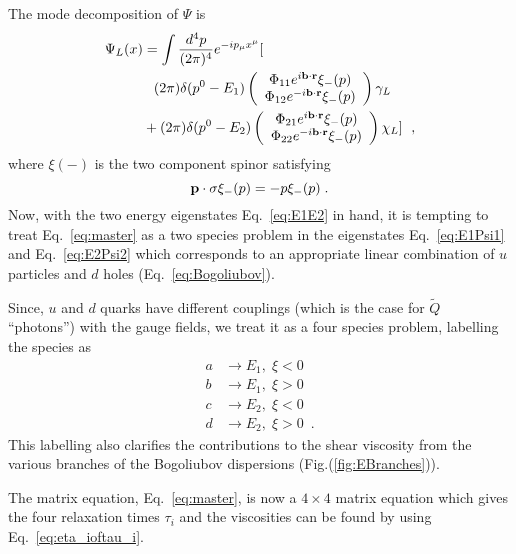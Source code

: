 \documentclass[10pt, aps, prd, superscriptaddress, nofootinbib, 
               amsmath, amssymb, twocolumn,
               preprintnumbers, showpacs,
               raggedbottom,
               floatfix]{revtex4-1}
\newcommand{\bfr}{{\bf{r}}}
\newcommand{\bfp}{{\bf{p}}}
\newcommand{\bfb}{{\bf{b}}}
\begin{document}
The mode decomposition of $\Psi$ is
\begin{equation}
\begin{split}
\Psi_L(x) 
&=
\int \frac{d^4p}{(2\pi)^4}e^{-ip_\mu x^\mu}[\\
&\phantom{+}(2\pi)\delta(p^0-E_1) \left(
\begin{array}{c}\Phi_{11}e^{i\bfb\cdot\bfr}\xi_{-}(p) \\ 
\Phi_{12}e^{-i\bfb\cdot\bfr}\xi_{-}(p)\end{array}
\right)\gamma_L\\
&+(2\pi)\delta(p^0-E_2) \left(
\begin{array}{c}\Phi_{21}e^{i\bfb\cdot\bfr}\xi_{-}(p) \\ 
\Phi_{22}e^{-i\bfb\cdot\bfr}\xi_{-}(p)\end{array}
\right)\chi_L]~\label{eq:Bogoliubov}\;,
\end{split}
\end{equation}
where $\xi(-)$ is the two component spinor satisfying
\begin{equation}
\bfp\cdot\sigma \xi_{-}(p)= -p \xi_{-}(p)\;.
\end{equation}
Now, with the two energy eigenstates Eq.~\ref{eq:E1E2} in hand, it is tempting
to treat Eq.~\ref{eq:master} as a two species problem in the eigenstates
Eq.~\ref{eq:E1Psi1} and Eq.~\ref{eq:E2Psi2} which corresponds to an appropriate
linear combination of $u$ particles and $d$ holes (Eq.~\ref{eq:Bogoliubov}).

Since, 
$u$ and $d$ quarks have different couplings (which is the case for $\tilde{Q}$
``photons'') with the gauge fields, we treat it as a four species problem,
labelling the species as 
\begin{equation}
\begin{split}
a&\rightarrow E_1, \; \xi<0 \\
b&\rightarrow E_1, \; \xi>0 \\
c&\rightarrow E_2, \; \xi<0 \\
d&\rightarrow E_2, \; \xi>0
~\label{eq:fourspecies}\;.
\end{split}
\end{equation}
This labelling also clarifies the contributions to the shear viscosity from the
various branches of the Bogoliubov dispersions (Fig.(\ref{fig:EBranches})). 

The matrix equation, Eq.~\ref{eq:master}, is now a $4\times 4$ matrix equation
which gives the four relaxation times $\tau_i$ and the viscosities can be found
by using Eq.~\ref{eq:eta_ioftau_i}.
\end{document}
